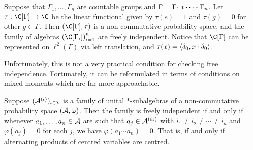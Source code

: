 \begin{example}
	\label{ex:freegroupsarefree}
	Suppose that $\Gamma_1, \ldots, \Gamma_n$ are countable groups and $\Gamma = \Gamma_1\mathop{\ast}\cdots\mathop{\ast}\Gamma_n$.
	Let $\tau : \C[\Gamma] \to \C$ be the linear functional given by $\tau(e) = 1$ and $\tau(g) = 0$ for other $g \in \Gamma$.
	Then $(\C[\Gamma], \tau)$ is a non-commutative probability space, and the family of algebras $\paren{\C[\Gamma_i]}_{i=1}^n$ are freely independent.
	Notice that $\C[\Gamma]$ can be represented on $\ell^2(\Gamma)$ via left translation, and $\tau(x) = \left\langle\delta_0, x\cdot\delta_0\right\rangle$.
\end{example}

Unfortunately, this is not a very practical condition for checking free independence.
Fortunately, it can be reformulated in terms of conditions on mixed moments which are far more approachable.
\begin{proposition}
\label{prop:freemomentsvanish}
	Suppose $(\mathcal{A}^{(\iota)})_{\iota\in\mathcal{I}}$ is a family of unital $*$-subalgebras of a non-commutative probability space $(\mathcal{A}, \varphi)$.
	Then the family is freely independent if and only if whenever $a_1, \ldots, a_n \in \mathcal{A}$ are such that $a_j \in \mathcal{A}^{(i_j)}$ with $i_1 \neq i_2\neq \cdots \neq i_n$ and $\varphi(a_j) = 0$ for each $j$, we have $\varphi(a_1\cdots a_n) = 0$.
	That is, if and only if alternating products of centred variables are centred.
\end{proposition}


